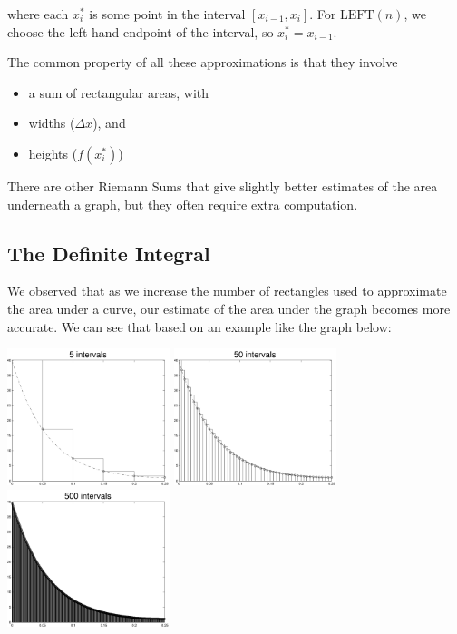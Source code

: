 where each $x_{i}^{*}$ is some point in the interval $[x_{i-1},
x_{i}]$.  For $\mbox{LEFT}(n)$, we choose the left hand endpoint of the
interval, so $x_{i}^* = x_{i-1}$.

\newpage

The common property of all these
approximations is that they involve
\begin{itemize}
\item a sum of rectangular areas, with \\[1ex]
\item widths ($\Delta x$), and \\[1ex]
\item heights ($f(x_i^*)$)
\end{itemize}

There are other Riemann Sums that give slightly better estimates of
the area underneath a graph, but they often require extra computation.

\newpage

\subsection*{The Definite Integral}

We observed that as we increase the number of rectangles used to
approximate the area under a curve, our estimate of the area under the
graph becomes more accurate.  We can see that based on an example like
the graph below:

\begin{center}
\includegraphics[height=4cm]{graphics/notes_04_f_lhr_5_intervals}
\includegraphics[height=4cm]{graphics/notes_04_f_lhr_50_intervals}
\includegraphics[height=4cm]{graphics/notes_04_f_lhr_500_intervals}
\end{center}

